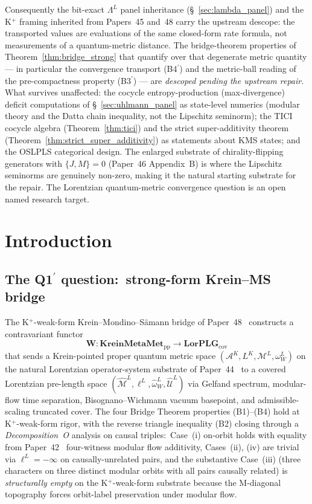 \documentclass[11pt,a4paper]{article}
\theoremstyle{plain}
\theoremstyle{definition}
\newcommand{\Acal}{\mathcal{A}}
\newcommand{\Mcal}{\mathcal{M}}
\newcommand{\Ucal}{\mathcal{U}}
\newcommand{\Lprop}{\Lambda^{L}}
\newcommand{\Wfun}{\mathbf{W}}
\newcommand{\KreinMM}{\mathbf{KreinMetaMet}_{\mathrm{pp}}}
\newcommand{\LorPLG}{\mathbf{LorPLG}_{\mathrm{cov}}}
\newcommand{\BWvac}{\omega_{W}^{L}}
\begin{document}
Consequently the bit-exact $\Lprop$ panel inheritance
(\S~\ref{sec:lambda_panel}) and the K$^{+}$ framing inherited from
Papers~45 and~48 carry the upstream descope: the transported values
are evaluations of the same closed-form rate formula, not
measurements of a quantum-metric distance. The bridge-theorem
properties of Theorem~\ref{thm:bridge_strong} that quantify over
that degenerate metric quantity --- in particular the convergence
transport (B4$^{\prime}$) and the metric-ball reading of the
pre-compactness property (B3$^{\prime}$) --- are \emph{descoped
pending the upstream repair}. What survives unaffected: the cocycle
entropy-production (max-divergence) deficit computations of
\S~\ref{sec:uhlmann_panel} as state-level numerics (modular theory
and the Datta chain inequality, not the Lipschitz seminorm); the
TICI cocycle algebra (Theorem~\ref{thm:tici}) and the strict
super-additivity theorem (Theorem~\ref{thm:strict_super_additivity})
as statements about KMS states; and the OSLPLS categorical design.
The enlarged substrate of chirality-flipping generators with $\{J,
M\} = 0$ (Paper~46 Appendix~B) is where the Lipschitz seminorms are
genuinely non-zero, making it the natural starting substrate for the
repair. The Lorentzian quantum-metric convergence question is an
open named research target.

\tableofcontents

\section{Introduction}\label{sec:intro}

\subsection{The Q1$^{\prime}$ question:\ strong-form Krein--MS bridge}
\label{sec:q1prime_question}

The K$^{+}$-weak-form Krein--Mondino--S\"amann bridge of
Paper~48~\cite{paper48} constructs a contravariant functor
\[
  \Wfun:\KreinMM\longrightarrow\LorPLG
\]
that sends a Krein-pointed proper quantum metric space
$(\Acal^{K},L^{K},\Mcal^{L},\BWvac)$ on the natural Lorentzian
operator-system substrate of Paper~44~\cite{paper44} to a covered
Lorentzian pre-length space
$(\hat{\Mcal}^{L},\ell^{L},\hat{\omega}_{W}^{L},\hat{\Ucal}^{L})$ via
Gelfand spectrum, modular-flow time separation, Bisognano--Wichmann
vacuum basepoint, and admissible-scaling truncated cover. The four
Bridge Theorem properties (B1)--(B4) hold at K$^{+}$-weak-form rigor,
with the reverse triangle inequality (B2) closing through a
\emph{Decomposition~O} analysis on causal triples:\ Case~(i) on-orbit
holds with equality from Paper~42~\cite{paper42} four-witness modular
flow additivity, Cases~(ii), (iv) are trivial via $\ell^{L}=-\infty$
on causally-unrelated pairs, and the substantive Case~(iii) (three
characters on three distinct modular orbits with all pairs causally
related) is \emph{structurally empty} on the K$^{+}$-weak-form
substrate because the M-diagonal topography forces orbit-label
preservation under modular flow.
\end{document}
